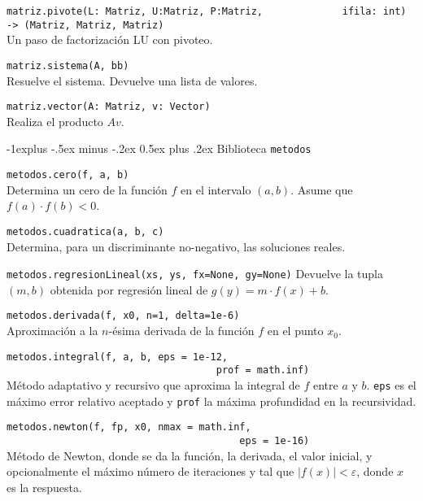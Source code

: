 \documentclass[10pt,landscape]{article}
\makeatletter
\renewcommand{\subsection}{\@startsection{subsection}{2}{0mm}%
                                {-1explus -.5ex minus -.2ex}%
                                {0.5ex plus .2ex}%
                                {\normalfont\normalsize\bfseries}}
\makeatother
\begin{document}
\begin{multicols}{3}
\begin{asparaitem}
\item \verb|matriz.pivote(L: Matriz, U:Matriz, P:Matriz,|
  \verb|             ifila: int) -> (Matriz, Matriz, Matriz)| \\
  \quad Un paso de factorizaci\'on LU con pivoteo.

\item \verb|matriz.sistema(A, bb)|\\
  \quad Resuelve el sistema. Devuelve una lista de valores.

\item \verb|matriz.vector(A: Matriz, v: Vector)| \\
  \quad Realiza el producto $Av$.
\end{asparaitem}


\subsection{Biblioteca \texttt{metodos}}


\begin{asparaitem}
\item \verb|metodos.cero(f, a, b)| \\
  Determina un cero de la funci\'on $f$ en el intervalo $(a, b)$. Asume que $f(a)\cdot f(b) < 0$.

\item \verb|metodos.cuadratica(a, b, c)|\\
  \quad Determina, para un discriminante no-negativo, las soluciones reales.

\item \verb|metodos.regresionLineal(xs, ys, fx=None, gy=None)|
  \quad Devuelve la tupla $(m, b)$ obtenida por regresi\'on lineal de $g(y) = m\cdot f(x) + b$.

\item \verb|metodos.derivada(f, x0, n=1, delta=1e-6)| \\
  \quad Aproximaci\'on a la $n$-\'esima derivada de la funci\'on $f$ en el punto $x_0$.

\item \verb|metodos.integral(f, a, b, eps = 1e-12,|\\
  \verb|                                    prof = math.inf)| \\
  \quad M\'etodo adaptativo y recursivo que aproxima la integral de $f$ entre $a$ y $b$. \verb|eps| es el m\'aximo error relativo aceptado y \verb|prof| la m\'axima profundidad en la recursividad.

\item \verb|metodos.newton(f, fp, x0, nmax = math.inf,|\\
  \verb|                                        eps = 1e-16)|\\
  \quad M\'etodo de Newton, donde se da la funci\'on, la derivada, el valor inicial, y opcionalmente el m\'aximo n\'umero de iteraciones y tal que $|f(x)|<\varepsilon$, donde $x$ es la respuesta.


\end{asparaitem}
\end{multicols}
\end{document}
